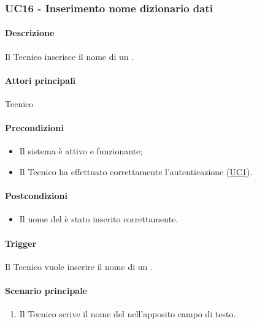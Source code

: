 \subsubsection{UC16 - Inserimento nome dizionario dati}\label{UC16}
\paragraph*{Descrizione}
Il Tecnico inserisce il nome di un .

\paragraph*{Attori principali}
Tecnico

\paragraph*{Precondizioni}
\begin{itemize}
  \item Il sistema è attivo e funzionante;
  \item Il Tecnico ha effettuato correttamente l'autenticazione (\hyperref[UC1]{UC1}).
\end{itemize}

\paragraph*{Postcondizioni}
\begin{itemize}
  \item Il nome del  è stato inserito correttamente.
\end{itemize}

\paragraph*{Trigger}
Il Tecnico vuole inserire il nome di un .

\paragraph*{Scenario principale}
\begin{enumerate}
  \item Il Tecnico scrive il nome del  nell'apposito campo di testo.
\end{enumerate}